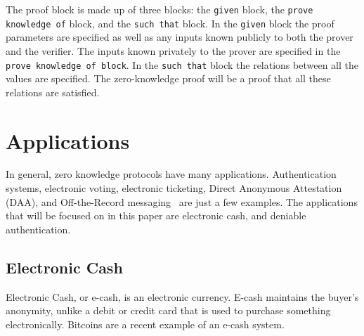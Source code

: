 \documentclass{sig-alternate}
\begin{document}
		The proof block is made up of three blocks: the \texttt{given} block, the 
		\texttt{prove knowledge of} block, and the \texttt{such that} block. In the
		\texttt{given} block the proof parameters are specified as well as any inputs
		known publicly to both the prover and the verifier. The inputs known privately to
		the prover are specified in the \texttt{prove knowledge of block}. In the 
		\texttt{such that} block the relations between all the values are specified.
		The zero-knowledge proof will be a proof that all these relations are satisfied.
		
	    
	    \begin{comment}
		\begin{verbatim}
		computation: // compute values required for proof
		  given: // declarations
		    group: G = <g. h>
		    exponents in G: x[2:3]
		  compute: // declarations and assignments
		    random exponents in G: r[1:3]
		    x_1 := x_2 * x_3
		    for(i, 1:3, c_i := g^x_i * h^r_i)
		    
		proof:
		  given: // declarations of public values
		    group: G = <g, h>
		    elements in G: c[1:3]
		    for(i, 1:3, commitment to x_i: c_i = g^x_i * h^r_i)
		  prove knowledge of: // declarations of private values
		    exponents in G: x[1:3], r[1:3]
		  such that: // protocol specification; i.e. relations
		    x_1 = x_2 * x_3
		\end{verbatim}
		
		In this example, the authors are proving that the value $x_{1}$ contained within
		the commitment $c_{1}$ is the product of $x_{2}$ and $x_{3}$ which are contained
		in $c_{2}$ and $c_{3}$ respectively. Because both blocks are optional, they are
		considered independent from each other, so a lines are repeated between the two.
		\end{comment}


\section{Applications}
	In general, zero knowledge protocols have many applications. Authentication systems,
	electronic voting, electronic ticketing, Direct Anonymous Attestation (DAA), and
	Off-the-Record messaging~\cite{ZKCrypt:2012, ZKPDL:2010} are just a few examples.
	The applications that will be focused on in this paper are electronic cash, and
	deniable authentication.
	
	\subsection{Electronic Cash}
	Electronic Cash, or e-cash, is an electronic currency. E-cash maintains the buyer's
	anonymity, unlike a debit or credit card that is used to purchase something 
	electronically. Bitcoins are a recent example of an e-cash system.
	
\end{document}
